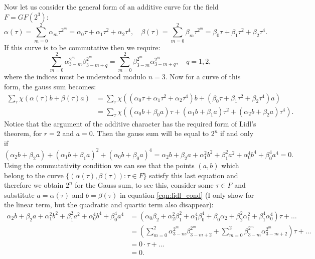 \documentclass[a4paper]{article}
\begin{document}
  Now let us consider the general form of an additive curve
  for the field $F = GF(2^3)$:
  \begin{equation}
    \alpha(\tau)
    = \sum_{m=0}^{2} \alpha_m \tau^{2^{m}}
    = \alpha_0\tau + \alpha_1\tau^2 + \alpha_2\tau^{4},
    \quad
    \beta(\tau)
    = \sum_{m=0}^{2} \beta_m \tau^{2^{m}}
    = \beta_0\tau + \beta_1\tau^2 + \beta_2\tau^{4}.
  \end{equation}
  If this curve is to be commutative then we require:
  \begin{equation}
    \sum_{m=0}^{2} \alpha_{3-m}^{2^{m}} \beta_{3-m+q}^{2^{m}}
    =
    \sum_{m=0}^{2} \beta_{3-m}^{2^{m}}
    \alpha_{3-m+q}^{2^{m}},
    \quad
    q = 1,2,
  \end{equation}
  where the indices must be understood modulo $n=3$. Now for
  a curve of this form, the gauss sum becomes:
  \begin{align}
    \sum_{\tau}^{} 
    \chi\left( \alpha(\tau)b + \beta(\tau)a \right) 
    &= \sum_{\tau}^{} 
    \chi\left(
    (\alpha_0\tau + \alpha_1\tau^2 + \alpha_2\tau^{4})b
    + (\beta_0\tau + \beta_1\tau^2 + \beta_2\tau^{4})a
    \right) \\
    &= \sum_{\tau}^{} 
    \chi\left( 
      (\alpha_0 b + \beta_0 a)\tau
      + (\alpha_1 b + \beta_1 a)\tau^2
      + (\alpha_2 b + \beta_2 a)\tau^{4}
    \right).
  \end{align}
  Notice that the argument of the additive character has the
  required form of Lidl's theorem, for $r = 2$ and $a = 0$.
  Then the gauss sum will be equal to $2^{n}$ if and only if
  \begin{equation}
    \label{eqn:lidl_cond}
      (\alpha_2 b + \beta_2 a)
      + (\alpha_1 b + \beta_1 a)^2
      + (\alpha_0 b + \beta_0 a)^{4}
      = \alpha_2 b + \beta_2 a
      + \alpha_1^2 b^2 + \beta_1^2 a^2
      + \alpha_0^{4} b^{4} + \beta_0^{4} a^{4}
      = 0.
  \end{equation}
  Using the commutativity condition we can see that the
  points $(a,b)$ which belong to the curve
  $\{(\alpha(\tau),\beta(\tau)) : \tau \in F\}$ satisfy this
  last equation and therefore we obtain $2^{n}$ for the
  Gauss sum, to see this, consider some $\tau \in F$
  and substitute $a = \alpha(\tau)$ and $b = \beta(\tau)$ in
  equation \eqref{eqn:lidl_cond} (I only show for the linear
  term, but the quadratic and quartic term also disappear): 
  \begin{align}
    \alpha_2 b + \beta_2 a
    + \alpha_1^2 b^2 + \beta_1^2 a^2
    + \alpha_0^{4} b^{4} + \beta_0^{4} a^{4}
    &= \left( 
      \alpha_0 \beta_2 + \alpha_2^2 \beta_1^2
      + \alpha_1^{4} \beta_0^{4}
      + \beta_0 \alpha_2 + \beta_2^2\alpha_1^2
      + \beta_1^{4}\alpha_0^{4}
    \right)\tau + \ldots \\
    &= \left( 
      \sum_{m=0}^{2}
      \alpha_{3-m}^{2^{m}} \beta_{3-m+2}^{2^{m}}
      + 
      \sum_{m=0}^{2}
      \beta_{3-m}^{2^{m}} \alpha_{3-m+2}^{2^{m}}
    \right) \tau + \ldots \\
    &= 0 \cdot \tau + \ldots \\
    &= 0.
  \end{align}
\end{document}
